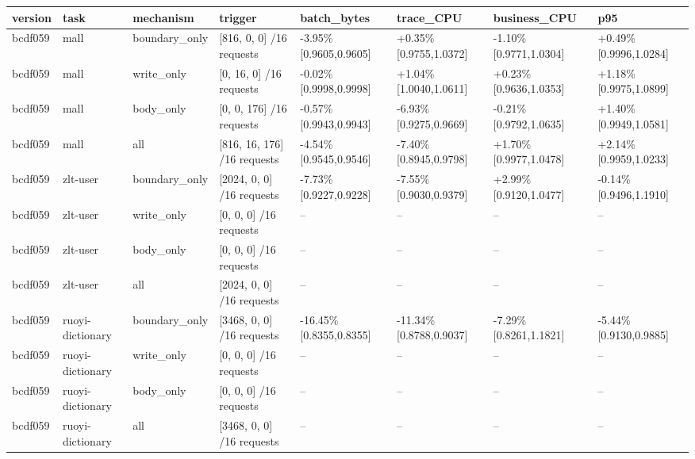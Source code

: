 \begin{tabular}{llllllll}
\hline
version & task & mechanism & trigger & batch\_bytes & trace\_CPU & business\_CPU & p95 \\
\hline
bcdf059 & mall & boundary\_only & [816, 0, 0] /16 requests & -3.95\% [0.9605,0.9605] & +0.35\% [0.9755,1.0372] & -1.10\% [0.9771,1.0304] & +0.49\% [0.9996,1.0284] \\
bcdf059 & mall & write\_only & [0, 16, 0] /16 requests & -0.02\% [0.9998,0.9998] & +1.04\% [1.0040,1.0611] & +0.23\% [0.9636,1.0353] & +1.18\% [0.9975,1.0899] \\
bcdf059 & mall & body\_only & [0, 0, 176] /16 requests & -0.57\% [0.9943,0.9943] & -6.93\% [0.9275,0.9669] & -0.21\% [0.9792,1.0635] & +1.40\% [0.9949,1.0581] \\
bcdf059 & mall & all & [816, 16, 176] /16 requests & -4.54\% [0.9545,0.9546] & -7.40\% [0.8945,0.9798] & +1.70\% [0.9977,1.0478] & +2.14\% [0.9959,1.0233] \\
bcdf059 & zlt-user & boundary\_only & [2024, 0, 0] /16 requests & -7.73\% [0.9227,0.9228] & -7.55\% [0.9030,0.9379] & +2.99\% [0.9120,1.0477] & -0.14\% [0.9496,1.1910] \\
bcdf059 & zlt-user & write\_only & [0, 0, 0] /16 requests & -- & -- & -- & -- \\
bcdf059 & zlt-user & body\_only & [0, 0, 0] /16 requests & -- & -- & -- & -- \\
bcdf059 & zlt-user & all & [2024, 0, 0] /16 requests & -- & -- & -- & -- \\
bcdf059 & ruoyi-dictionary & boundary\_only & [3468, 0, 0] /16 requests & -16.45\% [0.8355,0.8355] & -11.34\% [0.8788,0.9037] & -7.29\% [0.8261,1.1821] & -5.44\% [0.9130,0.9885] \\
bcdf059 & ruoyi-dictionary & write\_only & [0, 0, 0] /16 requests & -- & -- & -- & -- \\
bcdf059 & ruoyi-dictionary & body\_only & [0, 0, 0] /16 requests & -- & -- & -- & -- \\
bcdf059 & ruoyi-dictionary & all & [3468, 0, 0] /16 requests & -- & -- & -- & -- \\
\hline
\end{tabular}
